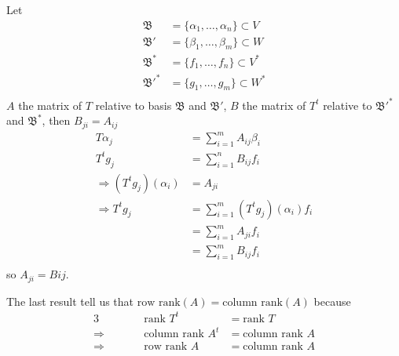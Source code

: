 \documentclass[../main.tex]{subfiles}
\begin{document}
Let 
\begin{align*}
    \mathfrak{B}&=\{\alpha_1,\dots,\alpha_n\}\subset V\\
    \mathfrak{B}'&=\{\beta_1,\dots,\beta_m\}\subset W\\
    \mathfrak{B}^*&=\{f_1,\dots,f_n\}\subset V^*\\
    \mathfrak{B}'^*&=\{g_1,\dots,g_m\}\subset W^*\\
\end{align*}
$A$ the matrix of $T$ relative to basis $\mathfrak{B}$ and $\mathfrak{B'}$, $B$ the matrix of $T^t$ relative to $\mathfrak{B'^*}$ and $\mathfrak{B^*}$, then $B_{ji}=A_{ij}$
\begin{align*}
    T\alpha_j &= \sum_{i=1}^m A_{ij}\beta_i\\
    T^t g_j &= \sum_{i=1}^n B_{ij}f_i\\
    \Longrightarrow (T^t g_j)(\alpha_i) &= A_{ji}\\
    \Longrightarrow T^t g_j &= \sum_{i=1}^m(T^t g_j)(\alpha_i) f_i\\
    &= \sum_{i=1}^m A_{ji} f_i\\
    &= \sum_{i=1}^m B_{ij} f_i\\
\end{align*}
so $A_{ji}=B{ij}$.

The last result tell us that $\text{row rank}(A) = \text{column rank}(A)$ because
\begin{alignat*}{3}
    &&\text{rank } T^t &= \text{rank } T\\
    \Longrightarrow \qquad&&\text{column rank } A^t &= \text{column rank } A\\
    \Longrightarrow \qquad&&\text{row rank } A &= \text{column rank } A\\
\end{alignat*}
\end{document}
